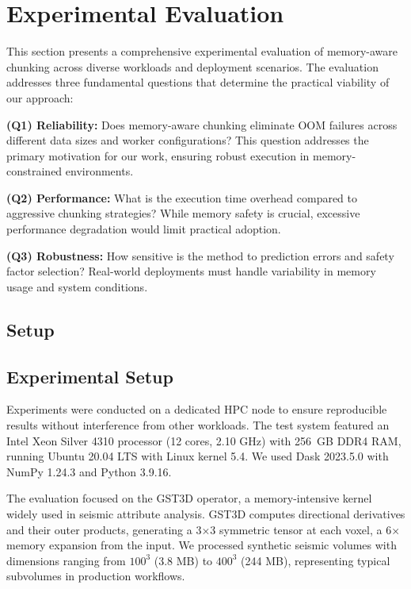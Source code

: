 \section{Experimental Evaluation}
\label{sec:experimental-results}

This section presents a comprehensive experimental evaluation of memory-aware chunking across diverse workloads and deployment scenarios.
The evaluation addresses three fundamental questions that determine the practical viability of our approach:

\textbf{(Q1) Reliability:} Does memory-aware chunking eliminate \ac{OOM} failures across different data sizes and worker configurations?
This question addresses the primary motivation for our work, ensuring robust execution in memory-constrained environments.

\textbf{(Q2) Performance:} What is the execution time overhead compared to aggressive chunking strategies?
While memory safety is crucial, excessive performance degradation would limit practical adoption.

\textbf{(Q3) Robustness:} How sensitive is the method to prediction errors and safety factor selection?
Real-world deployments must handle variability in memory usage and system conditions.

\subsection{Setup}

\subsection{Experimental Setup}

Experiments were conducted on a dedicated \ac{HPC} node to ensure reproducible results without interference from other workloads.
The test system featured an Intel Xeon Silver 4310 processor (12 cores, 2.10 GHz) with 256~\ac{GB} DDR4 \ac{RAM}, running Ubuntu 20.04 LTS with Linux kernel 5.4.
We used Dask 2023.5.0 with NumPy 1.24.3 and Python 3.9.16.

The evaluation focused on the \ac{GST3D} operator, a memory-intensive kernel widely used in seismic attribute analysis.
\ac{GST3D} computes directional derivatives and their outer products, generating a 3×3 symmetric tensor at each voxel, a 6× memory expansion from the input.
We processed synthetic seismic volumes with dimensions ranging from $100^3$ (3.8 \ac{MB}) to $400^3$ (244 \ac{MB}), representing typical subvolumes in production workflows.

